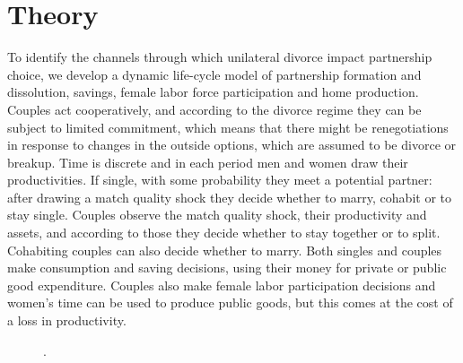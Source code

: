 \documentclass[12pt]{article}
\numberwithin{table}{section}
\begin{document}
\section{Theory}
To identify the channels through which unilateral divorce impact partnership choice, we develop a dynamic life-cycle model of partnership formation and dissolution, savings, female labor force participation and home production. Couples act cooperatively, and according to the divorce regime they can be subject to limited commitment, which means that there might be renegotiations in response to changes in the outside options, which are assumed to be divorce or breakup. Time is discrete and in each period men and women draw their productivities. If single, with some probability they meet a potential partner: after drawing a match quality shock they decide whether to marry, cohabit or to stay single. Couples observe the match quality shock, their productivity and assets, and according to those they decide whether to stay together or to split. Cohabiting couples can also decide whether to marry. Both singles and couples make consumption and saving decisions, using their money for private or public good expenditure. Couples also make female labor participation decisions and women's time can be used to produce public goods, but this comes at the cost of a loss in productivity.
\begin{figure}[h!]
	\label{fig:scheme}
	\caption{}
	\hspace{0.3cm}
	\resizebox{0.99\textwidth}{!}{}
	\begin{minipage}{0.99\textwidth} %
		\hspace{3em}
		{\footnotesize .\par}
	\end{minipage}
\end{figure}
\end{document}
